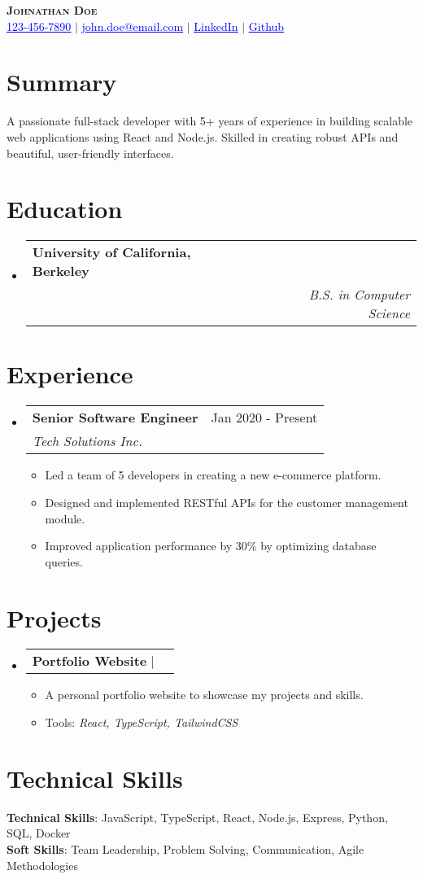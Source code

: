 \documentclass[letterpaper,11pt]{article}
\makeatletter
\newcommand{\resumeItem}[1]{\item\small{{#1 \vspace{-2pt}}}}
\newcommand{\resumeSubheading}[4]{\vspace{-2pt}\item\begin{tabular*}{0.97\textwidth}[t]{l@{\extracolsep{\fill}}r}\textbf{#1} & #2 \\ \textit{\small#3} & \textit{\small #4} \\ \end{tabular*}\vspace{-7pt}}
\newcommand{\resumeProjectHeading}[2]{\item\begin{tabular*}{0.97\textwidth}{l@{\extracolsep{\fill}}r}\small#1 & #2 \\ \end{tabular*}\vspace{-7pt}}
\newcommand{\resumeSubHeadingListStart}{\begin{itemize}[leftmargin=0.15in, label={}]}
\newcommand{\resumeSubHeadingListEnd}{\end{itemize}}
\newcommand{\resumeItemListStart}{\begin{itemize}}
\newcommand{\resumeItemListEnd}{\end{itemize}\vspace{-5pt}}
\makeatother
\begin{document}
\begin{center}
    \textbf{\Huge \scshape Johnathan Doe} \\ \vspace{1pt}
    \small \href{tel:123-456-7890}{\textcolor{blue}{\underline{123-456-7890}}} $|$ \href{mailto:john.doe@email.com}{\textcolor{blue}{\underline{john.doe@email.com}}} $|$ \href{https://linkedin.com/in/johndoe}{\textcolor{blue}{\underline{LinkedIn}}} $|$ \href{https://github.com/johndoe}{\textcolor{blue}{\underline{Github}}}
\end{center}

\section{Summary}
\small{A passionate full-stack developer with 5+ years of experience in building scalable web applications using React and Node.js. Skilled in creating robust APIs and beautiful, user-friendly interfaces.}

\section{Education}
  \resumeSubHeadingListStart
    \resumeSubheading
      {University of California, Berkeley}{}{}
      {B.S. in Computer Science}{2013 - 2017}
  \resumeSubHeadingListEnd

\section{Experience}
  \resumeSubHeadingListStart
    \resumeSubheading
      {Senior Software Engineer}{Jan 2020 - Present}
      {Tech Solutions Inc.}{}
      \resumeItemListStart
        \resumeItem{Led a team of 5 developers in creating a new e-commerce platform.}
        \resumeItem{Designed and implemented RESTful APIs for the customer management module.}
        \resumeItem{Improved application performance by 30\% by optimizing database queries.}
      \resumeItemListEnd
  \resumeSubHeadingListEnd

\section{Projects}
  \resumeSubHeadingListStart
    \resumeProjectHeading
      {\textbf{Portfolio Website} $|$ \emph{}}{}
      \resumeItemListStart
        \resumeItem{A personal portfolio website to showcase my projects and skills.}
        \resumeItem{Tools: \textit{React, TypeScript, TailwindCSS}}
      \resumeItemListEnd
  \resumeSubHeadingListEnd

\section{Technical Skills}
 \begin{itemize}[leftmargin=0.15in, label={}]
    \small{\item{
     \textbf{Technical Skills}{: JavaScript, TypeScript, React, Node.js, Express, Python, SQL, Docker} \\
     \textbf{Soft Skills}{: Team Leadership, Problem Solving, Communication, Agile Methodologies} \\
    }}
 \end{itemize}
\end{document}
